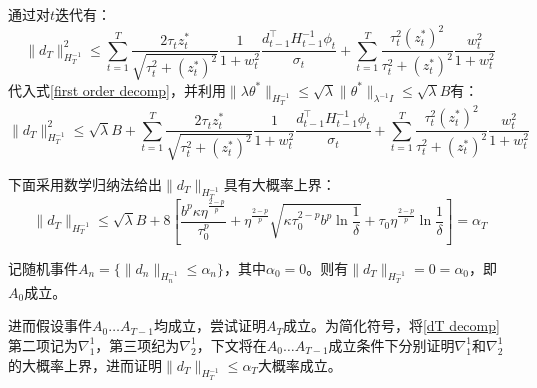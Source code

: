 \documentclass[UTF8,a4paper,10.5pt]{ctexart}
\begin{document}
通过对$t$迭代有：
\begin{equation*}
	\|d_T\|^2_{H_T^{-1}} \leq \sum_{t=1}^T \frac{2\tau_t z^*_t}{\sqrt{\tau_t^2+(z^*_t)^2}}\frac{1}{1+w_t^2}\frac{d_{t-1}^\top H_{t-1}^{-1}\phi_t}{\sigma_t} + \sum_{t=1}^T \frac{\tau_t^2(z^*_t)^2}{\tau_t^2+(z^*_t)^2}\frac{w_t^2}{1+w_t^2}
\end{equation*}
代入式\ref{first order decomp}，并利用$\|\lambda \theta^*\|_{H_T^{-1}}\leq \sqrt{\lambda}\|\theta^*\|_{\lambda^{-1} I}\leq \sqrt{\lambda} B$有：
\begin{equation}
	\|d_T\|^2_{H_T^{-1}} \leq \sqrt{\lambda}B + \sum_{t=1}^T \frac{2\tau_t z^*_t}{\sqrt{\tau_t^2+(z^*_t)^2}}\frac{1}{1+w_t^2}\frac{d_{t-1}^\top H_{t-1}^{-1}\phi_t}{\sigma_t} + \sum_{t=1}^T \frac{\tau_t^2(z^*_t)^2}{\tau_t^2+(z^*_t)^2}\frac{w_t^2}{1+w_t^2}
	\label{dT decomp}
\end{equation}

下面采用数学归纳法给出$\|d_T\|_{H_T^{-1}}$具有大概率上界：
\begin{equation*}
	\|d_T\|_{H_T^{-1}}\leq \sqrt{\lambda}B + 8\left[\frac{b^p\kappa \eta^{\frac{2-p}{p}}}{\tau_0^{p}} + \eta^{\frac{2-p}{p}}\sqrt{\kappa \tau_0^{2-p} b^p \ln\frac{1}{\delta}}+ \tau_0 \eta^{\frac{2-p}{p}}\ln\frac{1}{\delta}\right] =\alpha_T
\end{equation*}

记随机事件$A_n = \{ \|d_n\|_{H_n^{-1}}\leq \alpha_n\}$，其中$\alpha_0 = 0$。则有$\|d_T\|_{H_T^{-1}} = 0 = \alpha_0$，即$A_0$成立。

进而假设事件$A_0 \ldots A_{T-1}$均成立，尝试证明$A_{T}$成立。为简化符号，将\ref{dT decomp}第二项记为$\nabla^1_1$，第三项纪为$\nabla^1_2$，下文将在$A_0 \ldots A_{T-1}$成立条件下分别证明$\nabla^1_1$和$\nabla^1_2$的大概率上界，进而证明$\|d_T\|_{H_T^{-1}}\leq \alpha_T$大概率成立。
\end{document}
